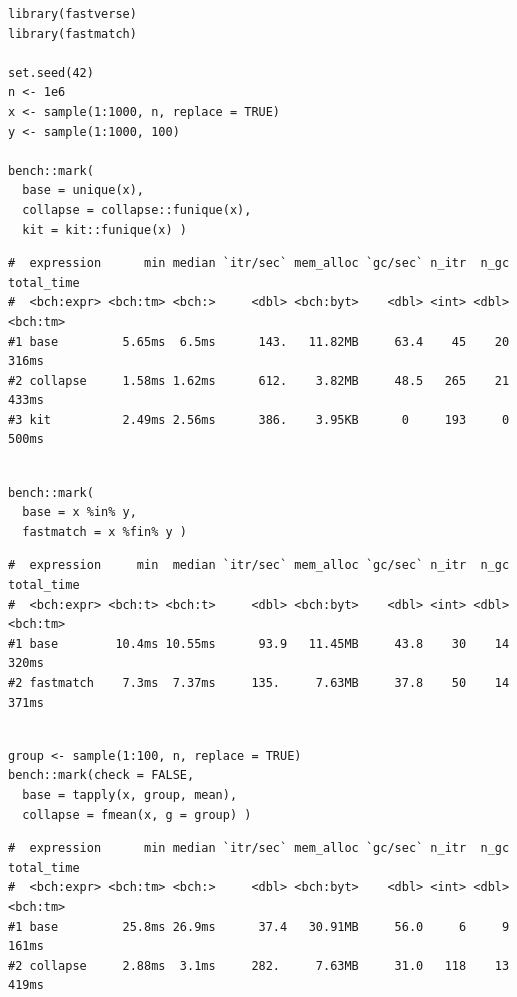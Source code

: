 \documentclass[10pt,twocolumn]{scrartcl}
\begin{document}
\begin{lstlisting}
library(fastverse)
library(fastmatch)

set.seed(42)
n <- 1e6
x <- sample(1:1000, n, replace = TRUE)
y <- sample(1:1000, 100)

bench::mark(
  base = unique(x),
  collapse = collapse::funique(x),
  kit = kit::funique(x) )
\end{lstlisting}
\begin{lstlisting}[aboveskip=-2pt,basicstyle=\fontsize{7.9pt}{8.5pt}\selectfont\ttfamily]
#  expression      min median `itr/sec` mem_alloc `gc/sec` n_itr  n_gc total_time
#  <bch:expr> <bch:tm> <bch:>     <dbl> <bch:byt>    <dbl> <int> <dbl>   <bch:tm>
#1 base         5.65ms  6.5ms      143.   11.82MB     63.4    45    20      316ms
#2 collapse     1.58ms 1.62ms      612.    3.82MB     48.5   265    21      433ms
#3 kit          2.49ms 2.56ms      386.    3.95KB      0     193     0      500ms
\end{lstlisting}
\begin{lstlisting}[aboveskip=-2pt]

bench::mark(
  base = x %in% y,
  fastmatch = x %fin% y )
\end{lstlisting}
\begin{lstlisting}[aboveskip=-2pt,basicstyle=\fontsize{7.9pt}{8.5pt}\selectfont\ttfamily]
#  expression     min  median `itr/sec` mem_alloc `gc/sec` n_itr  n_gc total_time
#  <bch:expr> <bch:t> <bch:t>     <dbl> <bch:byt>    <dbl> <int> <dbl>   <bch:tm>
#1 base        10.4ms 10.55ms      93.9   11.45MB     43.8    30    14      320ms
#2 fastmatch    7.3ms  7.37ms     135.     7.63MB     37.8    50    14      371ms
\end{lstlisting}
\begin{lstlisting}[aboveskip=-2pt]

group <- sample(1:100, n, replace = TRUE)
bench::mark(check = FALSE,
  base = tapply(x, group, mean),
  collapse = fmean(x, g = group) )
\end{lstlisting}
\begin{lstlisting}[aboveskip=-2pt,basicstyle=\fontsize{7.9pt}{8.5pt}\selectfont\ttfamily]
#  expression      min median `itr/sec` mem_alloc `gc/sec` n_itr  n_gc total_time
#  <bch:expr> <bch:tm> <bch:>     <dbl> <bch:byt>    <dbl> <int> <dbl>   <bch:tm>
#1 base         25.8ms 26.9ms      37.4   30.91MB     56.0     6     9      161ms
#2 collapse     2.88ms  3.1ms     282.     7.63MB     31.0   118    13      419ms
\end{lstlisting}
\end{document}
